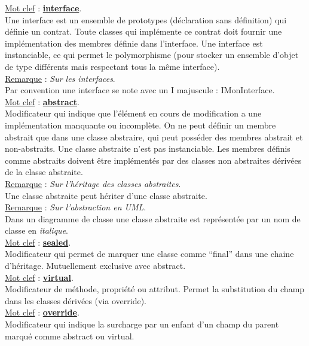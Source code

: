 \documentclass[a4paper,12pt,twoside]{article}
\newcommand{\urlcolor}{magenta}  %
\newcommand{\keycolor}{purple} %
\newcommand{\incode}[1]{{\footnotesize\ttfamily #1}} %
\newcommand{\rem}[2]{\noindent\underline{Remarque} : \textit{#1}.\\ \indent #2}
\newcommand{\keyref}[2]{\hypersetup{urlcolor=\keycolor} \href{#1}{\textbf{#2}}\hypersetup{urlcolor=\urlcolor}}
\newcommand{\keyword}[3]{\noindent\underline{Mot clef} : \keyref{#1}{#2}. \\ \indent #3}
\begin{document}
\keyword{https://docs.microsoft.com/fr-fr/dotnet/csharp/language-reference/keywords/interface}{interface}{Une interface est un ensemble de prototypes (déclaration sans définition) qui définie un contrat. Toute classes qui implémente ce contrat doit fournir une implémentation des membres définie dans l'interface. Une interface est instanciable, ce qui permet le polymorphisme (pour stocker un ensemble d'objet de type différents mais respectant tous la même interface).}\\

\rem{Sur les interfaces}{Par convention une interface se note avec un I majuscule : IMonInterface.}\\

\keyword{https://docs.microsoft.com/fr-fr/dotnet/csharp/language-reference/keywords/abstract}{abstract}{Modificateur qui indique que l'élément en cours de modification a une implémentation manquante ou incomplète. On ne peut définir un membre abstrait que dans une classe abstraire, qui peut posséder des membres abstrait et non-abstraits. Une classe abstraite n'est pas instanciable. Les membres définis comme abstraits doivent être implémentés par des classes non abstraites dérivées de la classe abstraite.} \\

\rem{Sur l'héritage des classes abstraites}{Une classe abstraite peut hériter d'une classe abstraite.}\\

\rem{Sur l'abstraction en UML}{Dans un diagramme de classe une classe abstraite est représentée par un nom de classe en \textit{italique}.} \\

\keyword{https://docs.microsoft.com/fr-fr/dotnet/csharp/language-reference/keywords/sealed}{sealed}{Modificateur qui permet de marquer une classe comme ``final'' dans une chaine d'héritage. Mutuellement exclusive avec \incode{abstract}.}\\

\keyword{https://docs.microsoft.com/fr-fr/dotnet/csharp/language-reference/keywords/virtual}{virtual}{Modificateur de méthode, propriété ou attribut. Permet la substitution du champ dans les classes dérivées (via \incode{override}).}\\

\keyword{https://docs.microsoft.com/fr-fr/dotnet/csharp/language-reference/keywords/override}{override}{Modificateur qui indique la surcharge par un enfant d'un champ du parent marqué comme \incode{abstract} ou \incode{virtual}.}\\
\end{document}

